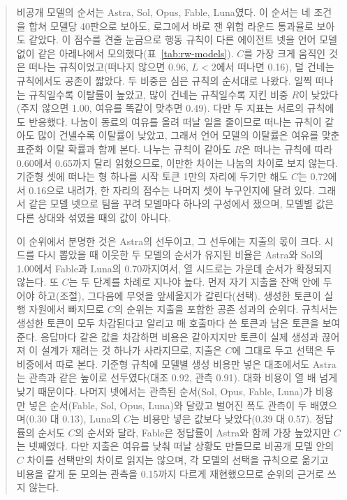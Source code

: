 \begin{quote}\small
{\color{black}비공개 모델의 순서는 Astra, Sol, Opus, Fable, Luna였다. 이 순서는 네 조건을 합쳐 모델당 40판으로 보아도, 로그에서 바로 잰 위험 라운드 통과율로 보아도 같았다. 이 점수를 견줄 눈금으로 행동 규칙이 다른 에이전트 넷을 언어 모델 없이 같은 아레나에서 모의했다(표~\ref{tab:rw-models}). $C$를 가장 크게 움직인 것은 떠나는 규칙이었고(떠나지 않으면 0.96, $L<2$에서 떠나면 0.16), 덜 건네는 규칙에서도 공존이 짧았다. 두 비중은 심은 규칙의 순서대로 나왔다. 일찍 떠나는 규칙일수록 이탈률이 높았고, 많이 건네는 규칙일수록 지킨 비중 $R$이 낮았다(주지 않으면 1.00, 여유를 똑같이 맞추면 0.49). 다만 두 지표는 서로의 규칙에도 반응했다. 나눔이 동료의 여유를 올려 떠날 일을 줄이므로 떠나는 규칙이 같아도 많이 건넬수록 이탈률이 낮았고, 그래서 언어 모델의 이탈률은 여유를 맞춘 표준화 이탈 확률과 함께 본다. 나누는 규칙이 같아도 $R$은 떠나는 규칙에 따라 0.60에서 0.65까지 달리 읽혔으므로, 이만한 차이는 나눔의 차이로 보지 않는다. 기준형 셋에 떠나는 형 하나를 시작 토큰 1만의 자리에 두기만 해도 $C$는 0.72에서 0.16으로 내려가, 한 자리의 점수는 나머지 셋이 누구인지에 달려 있다. 그래서 같은 모델 넷으로 팀을 꾸려 모델마다 하나의 구성에서 쟀으며, 모델별 값은 다른 상대와 섞였을 때의 값이 아니다.}

{\color{black}이 순위에서 분명한 것은 Astra의 선두이고, 그 선두에는 지출의 몫이 크다. 시드를 다시 뽑았을 때 이웃한 두 모델의 순서가 유지된 비율은 Astra와 Sol의 1.00에서 Fable과 Luna의 0.70까지여서, 열 시드로는 가운데 순서가 확정되지 않는다. 또 $C$는 두 단계를 차례로 지나야 높다. 먼저 자기 지출을 잔액 안에 두어야 하고(조절), 그다음에 무엇을 앞세울지가 갈린다(선택). 생성한 토큰이 실행 자원에서 빠지므로 $C$의 순위는 지출을 포함한 공존 성과의 순위다. 규칙서는 생성한 토큰이 모두 차감된다고 알리고 매 호출마다 쓴 토큰과 남은 토큰을 보여 준다. 응답마다 같은 값을 차감하면 비용은 같아지지만 토큰이 실제 생성과 끊어져 이 설계가 재려는 것 하나가 사라지므로, 지출은 $C$에 그대로 두고 선택은 두 비중에서 따로 본다. 기준형 규칙에 모델별 생성 비용만 넣은 대조에서도 Astra는 관측과 같은 높이로 선두였다(대조 0.92, 관측 0.91). 대화 비용이 열 배 넘게 낮기 때문이다. 나머지 넷에서는 관측된 순서(Sol, Opus, Fable, Luna)가 비용만 넣은 순서(Fable, Sol, Opus, Luna)와 달랐고 벌어진 폭도 관측이 두 배였으며(0.30 대 0.13), Luna의 $C$는 비용만 넣은 값보다 낮았다(0.39 대 0.57). 정답률의 순서도 $C$의 순서와 달라, Fable은 정답률이 Astra와 함께 가장 높았지만 $C$는 넷째였다. 다만 지출은 여유를 낮춰 떠날 상황도 만들므로 비공개 모델 안의 $C$ 차이를 선택만의 차이로 읽지는 않으며, 각 모델의 선택을 규칙으로 옮기고 비용을 같게 둔 모의는 관측을 0.15까지 다르게 재현했으므로 순위의 근거로 쓰지 않는다.}


\end{quote}

